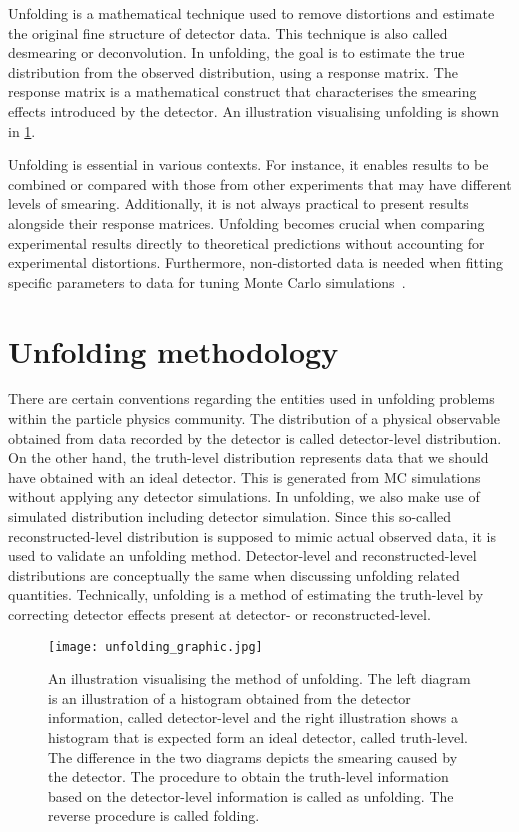 Unfolding is a mathematical technique used to remove distortions and estimate the original
fine structure of detector data. This technique is also called desmearing or deconvolution.
In unfolding, the goal is to estimate the true distribution from the observed distribution, 
using a response matrix. The response matrix is a mathematical construct that 
characterises the smearing effects introduced by the detector. An illustration visualising 
unfolding is shown in \cref{fig:unf_graphic}.

Unfolding is essential in various contexts. For instance, it enables results to be 
combined or compared with those from other experiments that may have different 
levels of smearing. Additionally, it is not always practical to present results alongside 
their response matrices. Unfolding becomes crucial when comparing experimental 
results directly to theoretical predictions without accounting for experimental 
distortions. Furthermore, non-distorted data is needed when fitting specific parameters to 
data for tuning Monte Carlo simulations~\cite{Lyons:2011cli}.


\section{Unfolding methodology}
\label{sec:unfmethod}

There are certain conventions regarding the entities used in unfolding problems within the particle physics 
community. The distribution of a physical observable obtained from data recorded by the detector is called detector-level 
distribution. On the other hand, the truth-level distribution represents data that we should
have obtained with an ideal detector. This is generated from MC simulations without applying any detector
simulations. In unfolding, we also make use of simulated distribution including detector simulation.
Since this so-called reconstructed-level distribution is supposed to mimic actual observed data, it is 
used to validate an unfolding method. Detector-level and reconstructed-level distributions are 
conceptually the same when discussing unfolding related quantities. Technically, unfolding
is a method of estimating the truth-level by correcting detector effects present at detector- or
reconstructed-level.

\begin{figure}
    \centering
        \texttt{[image: unfolding\_graphic.jpg]}
        \caption{An illustration visualising the method of unfolding. The left diagram is an illustration
        of a histogram obtained from the detector information, called detector-level and the right 
        illustration shows a histogram that is expected form an ideal detector, called truth-level.
        The difference in the two diagrams depicts the smearing caused by the detector. The procedure to
        obtain the truth-level information based on the detector-level information is called as 
        unfolding. The reverse procedure is called folding.}
           \label{fig:unf_graphic}
  \end{figure}

